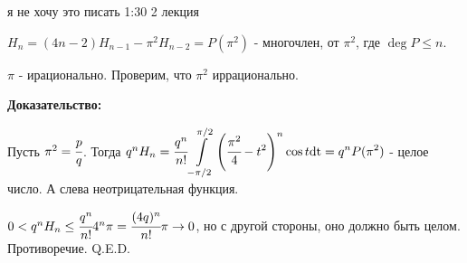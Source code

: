 я не хочу это писать 1:30 2 лекция

$H_n = (4n-2)H_{n-1} - \pi^2H_{n-2} = P(\pi^2)$ - многочлен, от $\pi^2$, где $\deg P\leq n$.


$\pi$ - ирационально. Проверим, что $\pi^2$ иррационально. 

\textbf{Доказательство:}

Пусть $\pi^2 = \cfrac{p}{q}$. Тогда $q^nH_n=\cfrac{q^n}{n!}\displaystyle\int\limits_{-\pi/2}^{\pi/2}\left(\cfrac{\pi^2}{4}-t^2\right)^n \cos t \text{dt} = q^n P(\pi^2)$ - целое число. А слева неотрицательная функция.

$0<q^nH_n \leq \cfrac{q^n}{n!}4^n\pi=\cfrac{(4q)^n}{n!}\pi\rightarrow 0$, но с другой стороны, оно должно быть целом. Противоречие.
\hfill Q.E.D.


